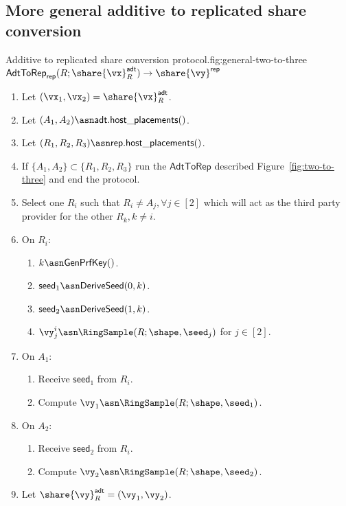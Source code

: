 \subsection{More general additive to replicated share conversion}


\begin{Boxfig}{Additive to replicated share conversion
protocol.}{fig:general-two-to-three}{$\mathsf{AdtToRep}_\mathsf{rep}(R;
\share{\vx}^{\mathsf{adt}}_{R}) \rightarrow \share{\vy}^\mathsf{rep}$}
\begin{enumerate}
\item Let $(\vx_1, \vx_2) = \share{\vx}^{\mathsf{adt}}_{R}$.
\item Let $(A_1, A_2) \asn \mathsf{adt}.\mathsf{host\_placements()}$.
\item Let $(R_1, R_2, R_3) \asn \mathsf{rep}.\mathsf{host\_placements()}$.
\item If $\{A_1, A_2\} \subset \{R_1, R_2, R_3\}$ run the $\mathsf{AdtToRep}$ described Figure~\ref{fig:two-to-three} and end the protocol.
\item Select one $R_i$ such that $R_i \neq A_j, \forall j \in [2]$ which will act as the third party provider for the other $R_k, k \neq i$.
\item On $R_i$:
\begin{enumerate}
    \item $k \asn \mathsf{GenPrfKey}()$.
    \item $\mathsf{seed}_1 \asn \mathsf{DeriveSeed}(0, k)$.
    \item $\mathsf{seed}_2 \asn \mathsf{DeriveSeed}(1, k)$.
    \item $\vy_j^i \asn \RingSample(R; \shape, \seed_j)$ for $j \in [2]$.
\end{enumerate}
\item On $A_1$:
\begin{enumerate}
    \item Receive $\mathsf{seed}_1$ from $R_i$.
    \item Compute $\vy_1 \asn \RingSample(R; \shape, \seed_1)$.
\end{enumerate}
\item On $A_2$:
\begin{enumerate}
    \item Receive $\mathsf{seed}_2$ from $R_i$.
    \item Compute $\vy_2 \asn \RingSample(R; \shape, \seed_2)$.
\end{enumerate}
\item Let $\share{\vy}^{\mathsf{adt}}_{R} = (\vy_1, \vy_2)$.

\end{enumerate}
\end{Boxfig}
